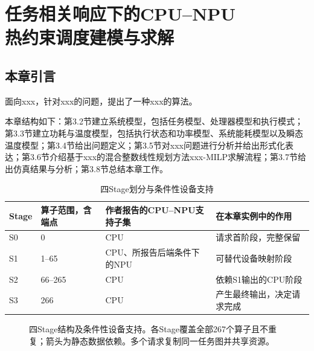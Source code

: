 \chapter[任务相关响应下的CPU--NPU热约束调度建模与求解]{任务相关响应下的CPU--NPU\\热约束调度建模与求解}
\label{chap:model}

\section{本章引言}

面向xxx，针对xxx的问题，提出了一种xxx的算法。

本章结构如下：第3.2节建立系统模型，包括任务模型、处理器模型和执行模式；第3.3节建立功耗与温度模型，包括执行状态和功率模型、系统能耗模型以及瞬态温度模型；第3.4节给出问题定义；第3.5节对xxx问题进行分析并给出形式化表达；第3.6节介绍基于xxx的混合整数线性规划方法xxx-MILP求解流程；第3.7节给出仿真结果与分析；第3.8节总结本章工作。

\begin{table}[!htbp]
\centering\small
\caption{四Stage划分与条件性设备支持}\label{tab:stage-support}
\begin{tabular}{@{}p{2.0cm}p{2.8cm}p{4.0cm}p{4.5cm}@{}}
\toprule
Stage & 算子范围，含端点 & 作者报告的CPU--NPU支持子集 & 在本章实例中的作用 \\
\midrule
S0 & 0 & CPU & 请求首阶段，完整保留 \\
S1 & 1--65 & CPU、所报告后端条件下的NPU & 可替代设备映射阶段 \\
S2 & 66--265 & CPU & 依赖S1输出的CPU阶段 \\
S3 & 266 & CPU & 产生最终输出，决定请求完成 \\
\bottomrule
\end{tabular}
\end{table}

\begin{figure}[htbp]
\centering
{}
\caption{四Stage结构及条件性设备支持。各Stage覆盖全部267个算子且不重复；箭头为静态数据依赖。多个请求复制同一任务图并共享资源。}
\label{fig:stage-structure}
\end{figure}


